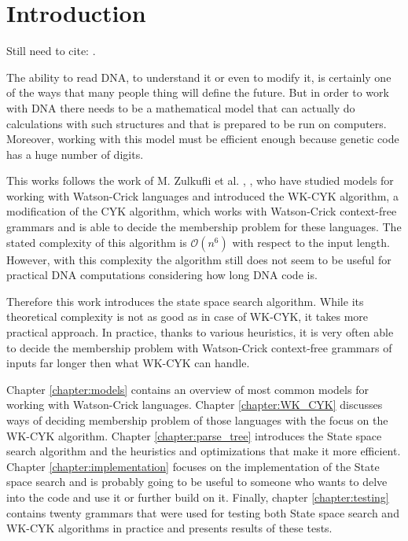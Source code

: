 \chapter{Introduction}

Still need to cite: \cite{PARALLEL}.

The ability to read DNA, to understand it or even to modify it, is certainly one of the ways that many people thing will define the future. But in order to work with DNA there needs to be a mathematical model that can actually do calculations with such structures and that is prepared to be run on computers. Moreover, working with this model must be efficient enough because genetic code has a huge number of digits.

This works follows the work of M. Zulkufli et al. \cite{WK_GRAMMARS_1}, \cite{WK_GRAMMARS_2}, \cite{WK_CYK} who have studied models for working with Watson-Crick languages and introduced the WK-CYK algorithm, a modification of the CYK algorithm, which works with Watson-Crick context-free grammars and is able to decide the membership problem for these languages. The stated complexity of this algorithm is $\mathcal{O}(n^6)$ with respect to the input length. However, with this complexity the algorithm still does not seem to be useful for practical DNA computations considering how long DNA code is.

Therefore this work introduces the state space search algorithm. While its theoretical complexity is not as good as in case of WK-CYK, it takes more practical approach. In practice, thanks to various heuristics, it is very often able to decide the membership problem with Watson-Crick context-free grammars of inputs far longer then what WK-CYK can handle.

Chapter \ref{chapter:models} contains an overview of most common models for working with Watson-Crick languages. Chapter \ref{chapter:WK_CYK} discusses ways of deciding membership problem of those languages with the focus on the WK-CYK algorithm. Chapter \ref{chapter:parse_tree} introduces the State space search algorithm and the heuristics and optimizations that make it more efficient. Chapter \ref{chapter:implementation} focuses on the implementation of the State space search and is probably going to be useful to someone who wants to delve into the code and use it or further build on it. Finally, chapter \ref{chapter:testing} contains twenty grammars that were used for testing both State space search and WK-CYK algorithms in practice and presents results of these tests.

